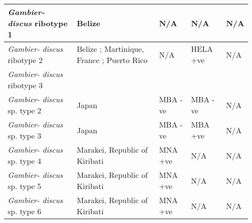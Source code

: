 \documentclass[12pt]{article}
\begin{document}
\begin{longtable}{ | p{2cm} | p{5.5cm} | p{2.3cm} | p{2.3cm} | p{2.3cm} | }
	\hline	
	\emph{Gambier- discus} ribotype 1 & Belize \cite{litaker2010global} & N/A & N/A & N/A \\
	\hline
	\emph{Gambier- discus} ribotype 2 & Belize \cite{litaker2010global}; Martinique, France \cite{litaker2010global}; Puerto Rico \cite{holland2013differences} & N/A & HELA +ve \cite{holland2013differences} & N/A\\
	\hline
	\emph{Gambier- discus} ribotype 3 & & & & \\ %
	\hline
	\emph{Gambier- discus} sp. type 2 & Japan \cite{nishimura2013genetic} & MBA -ve \cite{nishimura2013genetic} & MBA -ve \cite{nishimura2013genetic} & N/A \\
	\hline
	\emph{Gambier- discus} sp. type 3 & Japan \cite{nishimura2013genetic} & MBA -ve \cite{nishimura2013genetic} & MBA +ve \cite{nishimura2013genetic} & N/A \\
	\hline
	\emph{Gambier- discus} sp. type 4 &  Marakei, Republic of Kiribati \cite{xu2014distribution}& MNA +ve \cite{xu2014distribution} & N/A & N/A \\
	\hline
	\emph{Gambier- discus} sp. type 5 & Marakei, Republic of Kiribati \cite{xu2014distribution}& MNA +ve \cite{xu2014distribution} & N/A & N/A \\
	\hline
	\emph{Gambier- discus} sp. type 6 & Marakei, Republic of Kiribati \cite{xu2014distribution}& MNA +ve \cite{xu2014distribution} & N/A & N/A \\
	\hline
	\end{longtable}
	\FloatBarrier
\end{document}
